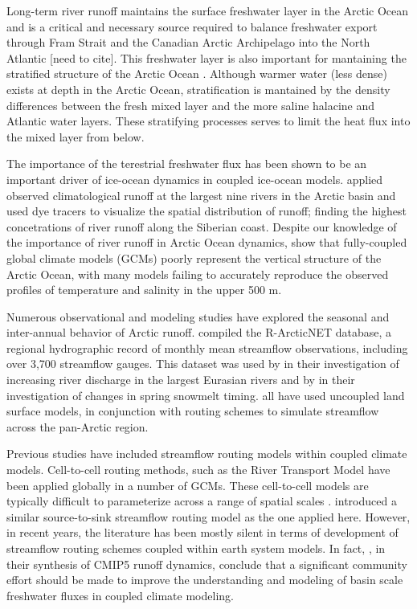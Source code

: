 \documentclass[ms, draft]{agutex}
\begin{document}
\begin{article}
Long-term river runoff maintains the surface freshwater layer in the Arctic Ocean and is a critical and necessary source required to balance freshwater export through Fram Strait and the Canadian Arctic Archipelago into the North Atlantic [need to cite].
This freshwater layer is also important for mantaining the stratified structure of the Arctic Ocean \citep{Nummelin_2015}.
Although warmer water (less dense) exists at depth in the Arctic Ocean, stratification is mantained by the density differences between the fresh mixed layer and the more saline halacine and Atlantic water layers.
These stratifying processes serves to limit the heat flux into the mixed layer from below.

The importance of the terestrial freshwater flux has been shown to be an important driver of ice-ocean dynamics in coupled ice-ocean models.
\citet{Newton_2008} applied observed climatological runoff at the largest nine rivers in the Arctic basin and used dye tracers to visualize the spatial distribution of runoff; finding the highest concetrations of river runoff along the Siberian coast.
Despite our knowledge of the importance of river runoff in Arctic Ocean dynamics, \citet{Nummelin_2015} show that fully-coupled global climate models (GCMs) poorly represent the vertical structure of the Arctic Ocean, with many models failing to accurately reproduce the observed profiles of temperature and salinity in the upper 500 m.

Numerous observational and modeling studies have explored the seasonal and inter-annual behavior of Arctic runoff.
\citet{Lammers_2001} compiled the R-ArcticNET database, a regional hydrographic record of monthly mean streamflow observations, including over 3,700 streamflow gauges.
This dataset was used by \citet{Shiklomanov_2009} in their investigation of increasing river discharge in the largest Eurasian rivers and by \citep{Tan_2011} in their investigation of changes in spring snowmelt timing.
\citet{Adam_2007, Adam_2008, Su_2007, Dai_2009} all have used uncoupled land surface models, in conjunction with routing schemes to simulate streamflow across the pan-Arctic region.

Previous studies have included streamflow routing models within coupled climate models.
Cell-to-cell routing methods, such as the River Transport Model \citep[RTM][]{Branstetter_2003} have been applied globally in a number of GCMs.
These cell-to-cell models are typically difficult to parameterize across a range of spatial scales \citep{Sushama_2004}.
\citep{Olivera_2000} introduced a similar source-to-sink streamflow routing model as the one applied here.
However, in recent years, the literature has been mostly silent in terms of development of streamflow routing schemes coupled within earth system models.
In fact, \citet{Bring_2015}, in their synthesis of CMIP5 runoff dynamics, conclude that a significant community effort should be made to improve the understanding and modeling of basin scale freshwater fluxes in coupled climate modeling.


\end{article}
\end{document}
